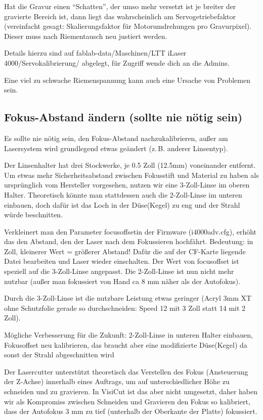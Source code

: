 \documentclass{\basedir/fablab-document}
\begin{document}
 Hat die Gravur einen \enquote{Schatten}, der umso mehr versetzt ist je breiter der gravierte Bereich ist, dann liegt das wahrscheinlich am Servogetriebefaktor (vereinfacht gesagt: Skalierungsfaktor für Motorumdrehungen pro Gravurpixel). Dieser muss nach Riementausch neu justiert werden.

 Details hierzu sind auf fablab-data/Maschinen/LTT iLaser 4000/Servokalibrierung/ abgelegt, für Zugriff wende dich an die Admins.

  Eine viel zu schwache Riemenspannung kann auch eine Ursache von Problemen sein.

\subsection{Fokus-Abstand ändern (sollte nie nötig sein)}
	Es sollte nie nötig sein, den Fokus-Abstand nachzukalibrieren, außer am Lasersystem wird grundlegend etwas geändert (z.\,B. anderer Linsentyp).

	Der Linsenhalter hat drei \glqq Stockwerke\grqq, je 0.5 Zoll (12.5mm) voneinander entfernt. Um etwas mehr Sicherheitsabstand zwischen Fokusstift und Material zu haben als ursprünglich vom Hersteller vorgesehen, nutzen wir eine 3-Zoll-Linse im oberen Halter. Theoretisch könnte man stattdessen auch die 2-Zoll-Linse im unteren einbauen, doch dafür ist das Loch in der \glqq Düse\grqq (Kegel) zu eng und der Strahl würde beschnitten.

	Verkleinert man den Parameter \glqq focusoffset\grqq in der Firmware (i4000adv.cfg), erhöht das den Abstand, den der Laser nach dem Fokussieren hochfährt. Bedeutung: in Zoll, kleinerer Wert = größerer Abstand! Dafür die auf der CF-Karte liegende Datei bearbeiten und Laser wieder einschalten. Der Wert von focusoffset ist speziell auf die 3-Zoll-Linse angepasst. Die 2-Zoll-Linse ist nun nicht mehr nutzbar (außer man fokussiert von Hand ca 8 mm näher als der Autofokus).

	Durch die 3-Zoll-Linse ist die nutzbare Leistung etwas geringer (Acryl 3mm XT ohne Schutzfolie gerade so durchschneiden: Speed 12 mit 3 Zoll statt 14 mit 2 Zoll).

	Mögliche Verbesserung für die Zukunft: 2-Zoll-Linse in unteren Halter einbauen, Fokusoffset neu kalibrieren, das braucht aber eine modifizierte \glqq Düse\grqq (Kegel) da sonst der Strahl abgeschnitten wird

    Der Lasercutter unterstützt theoretisch das Verstellen des Fokus (Ansteuerung der Z-Achse) innerhalb eines Auftrags, um auf unterschiedlicher Höhe zu schneiden und zu gravieren. In VisiCut ist das aber nicht umgesetzt, daher haben wir als Kompromiss zwischen Schneiden und Gravieren den Fokus so kalibriert, dass der Autofokus 3 mm zu tief (unterhalb der Oberkante der Platte) fokussiert.
\end{document}
